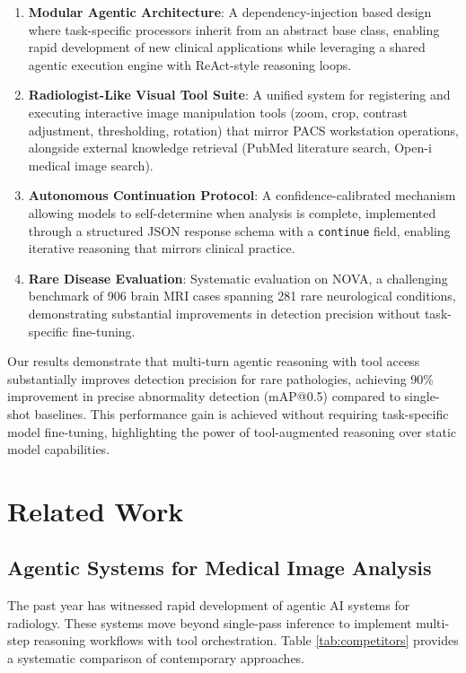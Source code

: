 \documentclass[11pt]{article}
\begin{document}
\begin{enumerate}
    \item \textbf{Modular Agentic Architecture}: A dependency-injection based design where task-specific processors inherit from an abstract base class, enabling rapid development of new clinical applications while leveraging a shared agentic execution engine with ReAct-style reasoning loops.
    
    \item \textbf{Radiologist-Like Visual Tool Suite}: A unified system for registering and executing interactive image manipulation tools (zoom, crop, contrast adjustment, thresholding, rotation) that mirror PACS workstation operations, alongside external knowledge retrieval (PubMed literature search, Open-i medical image search).
    
    \item \textbf{Autonomous Continuation Protocol}: A confidence-calibrated mechanism allowing models to self-determine when analysis is complete, implemented through a structured JSON response schema with a \texttt{continue} field, enabling iterative reasoning that mirrors clinical practice.
    
    \item \textbf{Rare Disease Evaluation}: Systematic evaluation on NOVA, a challenging benchmark of 906 brain MRI cases spanning 281 rare neurological conditions, demonstrating substantial improvements in detection precision without task-specific fine-tuning.
\end{enumerate}

Our results demonstrate that multi-turn agentic reasoning with tool access substantially improves detection precision for rare pathologies, achieving 90\% improvement in precise abnormality detection (mAP@0.5) compared to single-shot baselines. This performance gain is achieved without requiring task-specific model fine-tuning, highlighting the power of tool-augmented reasoning over static model capabilities.

\section{Related Work}
\label{sec:related_work}

\subsection{Agentic Systems for Medical Image Analysis}

The past year has witnessed rapid development of agentic AI systems for radiology. These systems move beyond single-pass inference to implement multi-step reasoning workflows with tool orchestration. Table \ref{tab:competitors} provides a systematic comparison of contemporary approaches.
\end{document}
